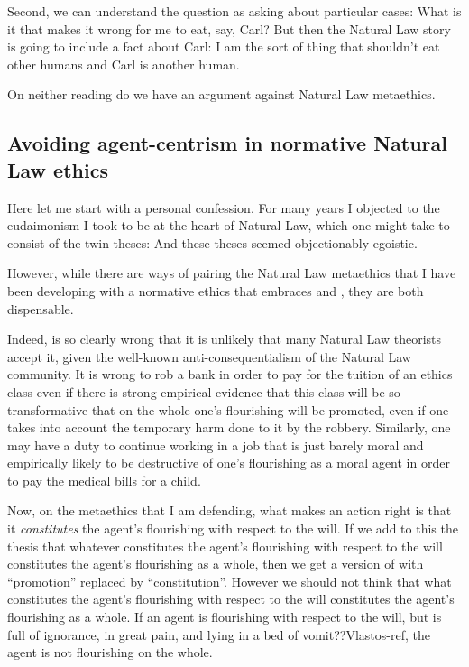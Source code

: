 Second, we can understand the question as asking about particular cases: What is it that makes it wrong for me to eat, say, Carl?
But then the Natural Law story is going to include a fact about Carl: I am the sort of thing that shouldn't eat other humans 
and Carl is another human. 

On neither reading do we have an argument against Natural Law metaethics.

\subsection{Avoiding agent-centrism in normative Natural Law ethics}
Here let me start with a personal confession. For many years I objected to the eudaimonism I took to be at the heart of Natural
Law, which one might take to consist of the twin theses:
And these theses seemed objectionably egoistic.

However, while there are ways of pairing the Natural Law metaethics that I have been developing with a normative ethics
that embraces  and , they are both dispensable. 

Indeed,  is so clearly wrong that it is unlikely that many Natural Law theorists accept it, given the 
well-known anti-consequentialism of the Natural Law community. It is wrong
to rob a bank in order to pay for the tuition of an ethics class even if there is strong empirical evidence that this 
class will be so transformative that on the whole one's flourishing will be promoted, even if one takes into account the
temporary harm done to it by the robbery. Similarly, one may have a duty to continue working in a job that is just barely
moral and empirically likely to be destructive of one's flourishing as a moral agent in order to pay the medical bills 
for a child. 

Now, on the metaethics that I am defending, what makes an action right is that it \textit{constitutes} the agent's 
flourishing with respect to the will. If we add to this the thesis that whatever constitutes the agent's flourishing
with respect to the will constitutes the agent's flourishing as a whole, then we get a version of 
with ``promotion'' replaced by ``constitution''. However we should not think that what constitutes the agent's
flourishing with respect to the will constitutes the agent's flourishing as a whole. If an agent is flourishing with
respect to the will, but is full of ignorance, in great pain, and lying in a bed of vomit??Vlastos-ref, the agent
is not flourishing on the whole. 

